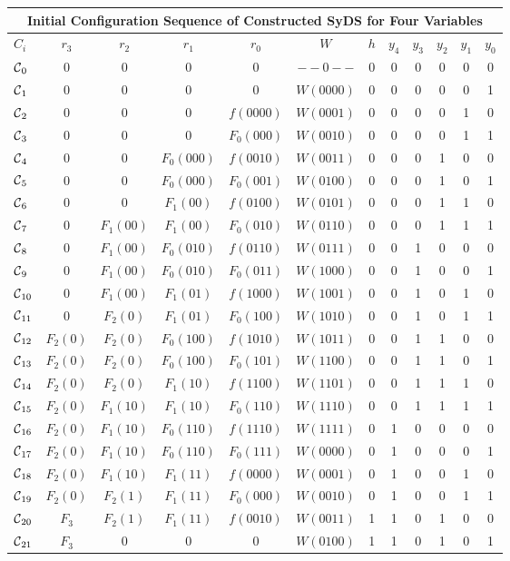\begin{tabular}{l | c c c c c c c c c c c |} \hline
\multicolumn{12}{c|}{{\bf Initial Configuration Sequence of  Constructed SyDS for Four Variables}}
        \\ \hline

$C_i$ &$r_3$ & $r_2$ & $r_1$ & $r_0$ & $W$ & $h$ & $y_4$ & $y_3$ & $y_2$ & $y_1$ & $y_0$ \\ \hline
$\mbox{$\mathcal{C}$}_0$ & 0 & 0 & 0 & 0 & $--0--$ & 0 & 0 & 0 & 0 & 0 & 0 \\ 
$\mbox{$\mathcal{C}$}_1$ & 0 & 0 & 0 & 0 & $W(0000)$ & 0 & 0 & 0 & 0 & 0 & 1 \\ 
$\mbox{$\mathcal{C}$}_2$ & 0 & 0 & 0 & $f(0000)$ & $W(0001)$ & 0 & 0 & 0 & 0 & 1 & 0 \\ 
$\mbox{$\mathcal{C}$}_3$ & 0 & 0 & 0 & $F_0(000)$ & $W(0010)$ & 0 & 0 & 0 & 0 & 1 & 1 \\ 
$\mbox{$\mathcal{C}$}_4$ & 0 & 0 & $F_0(000)$ & $f(0010)$ & $W(0011)$ & 0 & 0 & 0 & 1 & 0 & 0 \\ 
$\mbox{$\mathcal{C}$}_5$ & 0 & 0 & $F_0(000)$ & $F_0(001)$ & $W(0100)$ & 0 & 0 & 0 & 1 & 0 & 1 \\ 
$\mbox{$\mathcal{C}$}_6$ & 0 & 0 & $F_1(00)$ & $f(0100)$ & $W(0101)$ & 0 & 0 & 0 & 1 & 1 & 0 \\ 
$\mbox{$\mathcal{C}$}_7$ & 0 & $F_1(00)$ &$F_1(00)$ & $F_0(010)$ & $W(0110)$ & 0 & 0 & 0 & 1 & 1 & 1 \\ 
$\mbox{$\mathcal{C}$}_8$ & 0 & $F_1(00)$ & $F_0(010)$ & $f(0110)$ & $W(0111)$ & 0 & 0 & 1 & 0 & 0 & 0 \\ 
$\mbox{$\mathcal{C}$}_9$ & 0 & $F_1(00)$ & $F_0(010)$ & $F_0(011)$ & $W(1000)$ & 0 & 0 & 1 & 0 & 0 & 1 \\ 
$\mbox{$\mathcal{C}$}_{10}$ & 0 & $F_1(00)$ & $F_1(01)$ & $f(1000)$ & $W(1001)$ & 0 & 0 & 1 & 0 & 1 & 0 \\ 
$\mbox{$\mathcal{C}$}_{11}$ & 0 & $F_2(0)$ & $F_1(01)$ & $F_0(100)$ & $W(1010)$ & 0 & 0 & 1 & 0 & 1 & 1 \\ 
$\mbox{$\mathcal{C}$}_{12}$ & $F_2(0)$& $F_2(0)$ & $F_0(100)$ & $f(1010)$ & $W(1011)$ & 0 & 0 & 1 & 1 & 0 & 0 \\ 
$\mbox{$\mathcal{C}$}_{13}$ & $F_2(0)$& $F_2(0)$ & $F_0(100)$ & $F_0(101)$ & $W(1100)$ & 0 & 0 & 1 & 1 & 0 & 1 \\ 
$\mbox{$\mathcal{C}$}_{14}$ & $F_2(0)$ & $F_2(0)$ & $F_1(10)$ & $f(1100)$ & $W(1101)$ & 0 & 0 & 1 & 1 & 1 & 0 \\ 
$\mbox{$\mathcal{C}$}_{15}$ & $F_2(0)$ & $F_1(10)$ & $F_1(10)$ & $F_0(110)$ & $W(1110)$ & 0 & 0 & 1 & 1 & 1 & 1 \\ 
$\mbox{$\mathcal{C}$}_{16}$ & $F_2(0)$ & $F_1(10)$ & $F_0(110)$ & $f(1110)$ & $W(1111)$ & 0 & 1 & 0 & 0 & 0 & 0 \\ 
$\mbox{$\mathcal{C}$}_{17}$ & $F_2(0)$ & $F_1(10)$ & $F_0(110)$ & $F_0(111)$ & $W(0000)$ & 0 & 1 & 0 & 0 & 0 & 1 \\ 
$\mbox{$\mathcal{C}$}_{18}$ & $F_2(0)$ & $F_1(10)$ & $F_1(11)$ & $f(0000)$ & $W(0001)$ & 0 & 1 & 0 & 0 & 1 & 0 \\ 
$\mbox{$\mathcal{C}$}_{19}$ & $F_2(0)$ & $F_2(1)$ & $F_1(11)$ & $F_0(000)$ & $W(0010)$ & 0 & 1 & 0 & 0 & 1 & 1 \\ 
$\mbox{$\mathcal{C}$}_{20}$ & $F_3$ & $F_2(1)$ & $F_1(11)$ & $f(0010)$ & $W(0011)$ & 1 & 1 & 0 & 1 & 0 & 0 \\ 
$\mbox{$\mathcal{C}$}_{21}$ & $F_3$ & 0 & 0 & 0 & $W(0100)$ & 1 & 1 & 0 & 1 & 0 & 1 \\ 
\end{tabular}

